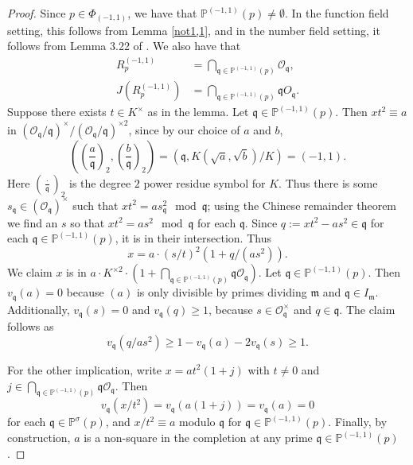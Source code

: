 \documentclass[12pt,reqno]{amsart}
\newcommand{\qq}{\mathfrak{q}}
\newcommand{\mm}{\mathfrak{m}}
\newcommand{\OO}{\mathcal{O}}
\newcommand{\PP}{\mathbb{P}}
\theoremstyle{definition}
\begin{document}
\begin{proof}
Since $p\in \Phi_{(-1,1)}$, we have that $\PP^{(-1,1)}(p)\not=\emptyset$. In the function field setting, this follows from Lemma \ref{not1,1}, and in the number field setting, it follows from Lemma 3.22 of \cite{Park}. We also have that 
\begin{align*}
R_p^{(-1,1)}&=\bigcap_{\qq\in \PP^{(-1,1)}(p)} \OO_{\qq}, \\ 
J(R_p^{(-1,1)})&=\bigcap_{\qq\in \PP^{(-1,1)}(p)} \qq O_{\qq}.
\end{align*}
Suppose there exists $t\in K^{\times}$ as in the lemma. Let $\qq\in \PP^{(-1,1)}(p)$. Then $xt^2\equiv a$ in  $(\OO_{\qq}/\qq)^{\times}/(\OO_{\qq}/\qq)^{\times2}$, since by our choice of $a$ and $b$,
\[
\left(\left(\frac{a}{\qq}\right)_2,\left(\frac{b}{\qq}\right)_2\right) = (\qq,K(\sqrt{a},\sqrt{b})/K)=(-1,1).
\]
Here $\left(\frac{\cdot}{\qq}\right)_2$ is the degree $2$ power residue symbol for $K$. Thus there is some $s_{\qq}\in (\OO_{\qq})^{\times}$ such that $xt^2=as_{\qq}^2 \mod \qq$; using the Chinese remainder theorem we find an $s$ so that $xt^2=as^2\mod \qq$ for each $\qq$. Since $q:=xt^2-as^2\in \qq$ for each $\qq\in \PP^{(-1,1)}(p)$, it is in their intersection. Thus
\[
x=a\cdot(s/t)^2(1+q/(as^2)).
\]
We claim $x$ is in $a\cdot K^{\times2}\cdot (1+\bigcap_{\qq\in \PP^{(-1,1)}(p)} \qq\OO_{\qq})$. Let $\qq\in \PP^{(-1,1)}(p)$. Then $v_{\qq}(a)=0$ because $(a)$ is only divisible by primes dividing $\mm$ and $\qq\in I_{\mm}$. Additionally, $v_{\qq}(s)=0$ and $v_{\qq}(q)\geq 1$, because $s\in \OO_{\qq}^{\times}$ and $q \in \qq$. The claim follows as 
\[
v_{\qq}(q/as^2)\geq 1-v_{\qq}(a)-2v_{\qq}(s)\geq1.
\]

For the other implication, write $x=at^2(1+j)$ with $t\not=0$ and $j\in \bigcap_{\qq\in \PP^{(-1,1)}(p)} \qq \OO_{\qq}$. Then 
\[
v_{\qq}(x/t^2)=v_{\qq}(a(1+j))=v_{\qq}(a)=0
\]
for each $\qq\in \PP^{\sigma}(p)$, and $x/t^2\equiv a$ modulo $\qq$ for $\qq\in \PP^{(-1,1)}(p)$. Finally, by construction, $a$ is a non-square in the completion at any prime $\qq\in \PP^{(-1,1)}(p)$.
\end{proof}
\end{document}
